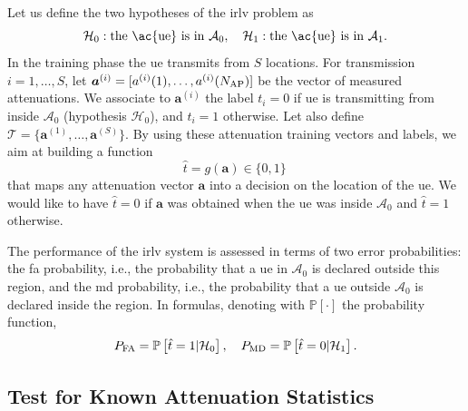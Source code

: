 \documentclass[conference,final]{IEEEtran}
\newcommand{\pr}[1]{\mathbb{P} \left[ #1 \right]}
\begin{document}
Let us define the two hypotheses of the \ac{irlv} problem as
 \begin{equation}
  \mathcal H_0: \mbox{the \ac{ue} is in $\mathcal{A}_0$}, \quad  \mathcal H_1: \mbox{the \ac{ue} is in $\mathcal{A}_1$}.
\end{equation}
In the training phase the \ac{ue} transmits from $S$ locations. For transmission $i=1,\ldots,S$, let $\bm{a}^{(i)}=[a^{(i)}(1),\ldots,a^{(i)}(N_{\rm AP})]$ 
be the  vector of  measured attenuations. We associate to $\bm a ^{(i)}$ the label $t_i=0$ if \ac{ue} is transmitting from inside $\mathcal{A}_0$ (hypothesis $\mathcal{H}_0$), and $t_i=1$ otherwise. Let also define $\mathcal{T} =
 \{\bm{a}^{(1)}, \ldots , \bm{a}^{(S)} \}$.
By using these attenuation training vectors and labels, we aim at building a function
\begin{equation}
    \hat{t} = g(\bm{a}) \in \{0,1\}\,
\end{equation}
that maps any attenuation vector $\bm{a}$ into a decision on the location of the \ac{ue}. We would like to have $\hat{t}=0$ if $\bm a$ was obtained when the \ac{ue} was inside $\mathcal{A}_0$ and $\hat{t}=1$ otherwise.

The performance of the \ac{irlv} system is assessed in terms of two error probabilities: the \ac{fa} probability, i.e., the probability  that a \ac{ue} in $\mathcal A_0$ is declared outside this region, and the \ac{md} probability, i.e., the probability that a \ac{ue} outside $\mathcal A_0$ is declared inside the region. In formulas, denoting with $\pr{\cdot}$ the probability function,
\begin{equation}
P_{\rm FA} =\pr{\hat{t} =1 | \mathcal H_0}, \quad  
 P_{\rm MD}=\pr{\hat{t} = 0 | \mathcal H_1}. 
\end{equation}


\subsection{Test for Known Attenuation Statistics}
\end{document}
